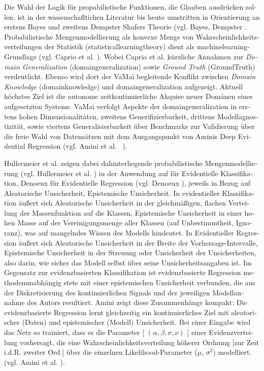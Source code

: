 \begin{otherlanguage}{ngerman}
Die Wahl der Logik für propabilistische Funktionen, die Glauben ausdrücken sollen, ist in der wissenschafltichen Literatur bis heute umstritten in Orientierung an erstens Bayes und zweitens Dempster Shafers Theorie (vgl. Bayes, Dempster \parencite{bayes1763essay, dempster1967upper, shafer1976mathematical}. Probabilistische Mengenmodellierung als konvexe Menge von Wahrscheinlichkeitsverteilungen der Statistik (\gls{statisticallearningtheory}) dient als \gls{machinelearning}-Grundlage (vgl. Caprio et al. \parencite{caprio2024credal}). Wobei Caprio et al. kürzliche Annahmen zur \textit{Domain Generalization} (\gls{domaingeneralization}) sowie \textit{Ground Truth} (\gls{GroundTruth}) verdeutlicht. Ebenso wird dort der VaMai begleitende Konflikt zwischen \textit{Domain Knowledge} (\gls{domainknowledge}) und \gls{domaingeneralization} aufgezeigt. Aktuell höchstes Ziel ist die autonome zeitkontinuierliche Akquise neuer Domänen eines aufgesetzten Systems. VaMai verfolgt Aspekte der \gls{domaingeneralization} in erstens hohen Dimensionalitäten, zweitens Generifizierbarkeit, drittens Modellagnostizität, sowie viertens Generalisierbarkeit über Benchmarks zur Validierung über die freie Wahl von Datensätzen mit dem Ausgangspunkt von Aminis Deep Evidential Regression (vgl. Amini et al. ~\parencite{amini2020deep}).

Hullermeier et al. zeigen dabei dahinterliegende probabilistische Mengenmodellierung (vgl. Hullermeier et al. \parencite{javanmardi2024conformalized}) in der Anwendung auf für Evidentielle Klassifikation, Denoeux für Evidentielle Regression (vgl. Denoeux \parencite{denoeux2022evidential}), jeweils in Bezug auf \gls{Aleatorische Unsicherheit}, \gls{Epistemische Unsicherheit}. In evidentieller Klassifikation äußert sich \gls{Aleatorische Unsicherheit} in der gleichmäßigen, flachen Verteilung der Massenfunktion auf die Klassen, \gls{Epistemische Unsicherheit} in einer hohen Masse auf der Vereinigungsmenge aller Klassen (auf Unbestimmtheit, Ignoranz), was auf mangelndes Wissen des Modells hindeutet. In Evidentieller Regression äußert sich \gls{Aleatorische Unsicherheit} in der Breite der Vorhersage-Intervalle, \gls{Epistemische Unsicherheit} in der Streuung oder \glqq{}Unsicherheit der Unsicherheiten\grqq{}, also darin, wie sicher das Modell selbst über seine Unsicherheitsangaben ist. Im Gegensatz zur evidenzbasierten Klassifikation ist evidenzbasierte Regression methodenunabhängig stets mit einer epistemischen Unsicherheit verbunden, die aus der Diskretisierung des kontinuierlichen Signals und der jeweiligen Modellannahme des Autors resultiert. Amini zeigt diese Zusammenhänge kompakt: \glqq Die evidenzbasierte Regression lernt gleichzeitig ein kontinuierliches Ziel mit aleatorischer (Daten) und epistemischer (Modell) Unsicherheit. Bei einer Eingabe wird das Netz so trainiert, dass es die Parameter [ $(\alpha, \beta, \sigma, \nu)$ ] einer Evidenzverteilung vorhersagt, die eine Wahrscheinlichkeitsverteilung höherer Ordnung [zur Zeit i.d.R. zweiter Ord.] über die einzelnen Likelihood-Parameter ($\mu$, $\sigma^{2}$) modelliert.\grqq{} (vgl. Amini et al. \parencite[{S.1, Abbildung 1}]{amini2020deep}).


\end{otherlanguage}
